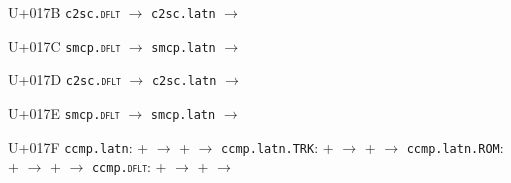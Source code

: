 \documentclass{article}
\begin{document}
\begin{substitutions}
\goodbreak

U+017B  \linebreak
    \texttt{c2sc.\textsc{dflt}} $\to$  \linebreak
    \texttt{c2sc.latn} $\to$  

\goodbreak

U+017C  \linebreak
    \texttt{smcp.\textsc{dflt}} $\to$  \linebreak
    \texttt{smcp.latn} $\to$  

\goodbreak

U+017D  \linebreak
    \texttt{c2sc.\textsc{dflt}} $\to$  \linebreak
    \texttt{c2sc.latn} $\to$  

\goodbreak

U+017E  \linebreak
    \texttt{smcp.\textsc{dflt}} $\to$  \linebreak
    \texttt{smcp.latn} $\to$  

\goodbreak

U+017F  \linebreak
    \texttt{ccmp.latn}:
\linebreak\null\quad{} \space +  \space $\to$  
\linebreak\null\quad{} \space +  \space $\to$  
\linebreak
\texttt{ccmp.latn.TRK}:
\linebreak\null\quad{} \space +  \space $\to$  
\linebreak\null\quad{} \space +  \space $\to$  
\linebreak
\texttt{ccmp.latn.ROM}:
\linebreak\null\quad{} \space +  \space $\to$  
\linebreak\null\quad{} \space +  \space $\to$  
\linebreak
\texttt{ccmp.\textsc{dflt}}:
\linebreak\null\quad{} \space +  \space $\to$  
\linebreak\null\quad{} \space +  \space $\to$  


\goodbreak

\end{substitutions}
\end{document}
